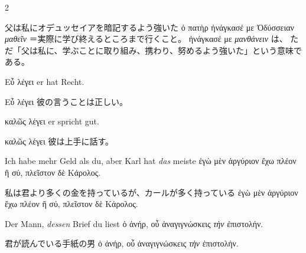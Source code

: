 \begin{paracol}{2}
\begin{enumerate}[leftmargin=0pt,rightmargin=0pt,listparindent =1cm,labelindent=1cm,labelsep=1ex,labelwidth={*},itemindent={*},align=left]
\begin{japanese}
父は私にオデュッセイアを暗記するよう強いた
\textgreek[variant=ancient]{ὁ πατὴρ ἠνάγκασέ με Ὀδύσσειαν \emph{μαθεῖν}}
＝実際に学び終えるところまで行くこと。
\textgreek[variant=ancient]{ἠνάγκασέ με \emph{μανθάνειν}} は、
ただ「父は私に、学ぶことに取り組み、携わり、努めるよう強いた」という意味である。
\end{japanese}
\switchcolumn*

\begin{german}
\item \textgreek[variant=ancient]{Εὖ λέγει }er hat Recht.
\end{german}
\switchcolumn

\begin{japanese}
\textgreek[variant=ancient]{Εὖ λέγει} 彼の言うことは正しい。
\end{japanese}
\switchcolumn*

\begin{german}
\begin{continuousitemline}\textgreek[variant=ancient]{καλῶς λέγει}
er spricht gut.\par\end{continuousitemline}
\end{german}
\switchcolumn

\begin{japanese}
\textgreek[variant=ancient]{καλῶς λέγει} 彼は上手に話す。
\end{japanese}
\switchcolumn*

\begin{german}
\item Ich habe mehr Geld als du, aber Karl hat \emph{das} meiste \textgreek[variant=ancient]{ἐγὼ
μὲν ἀργύριον ἔχω πλέον ἢ σύ, πλεῖστον δὲ Κάρολος.}
\end{german}
\switchcolumn

\begin{japanese}
私は君より多くの金を持っているが、カールが多く持っている
\textgreek[variant=ancient]{ἐγὼ μὲν ἀργύριον ἔχω πλέον ἢ σύ, πλεῖστον δὲ Κάρολος.}
\end{japanese}
\switchcolumn*

\begin{german}
\item Der Mann, \emph{dessen} Brief du liest \textgreek[variant=ancient]{ὁ
ἀνήρ, οὖ ἀναγιγνώσκεις \emph{τὴν} ἐπιστολήν.}
\end{german}
\switchcolumn

\begin{japanese}
君が読んでいる手紙の男
\textgreek[variant=ancient]{ὁ ἀνήρ, οὖ ἀναγιγνώσκεις \emph{τὴν} ἐπιστολήν.}
\end{japanese}
\switchcolumn*


\end{enumerate}
\end{paracol}
